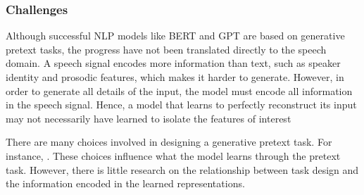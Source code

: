 

\subsubsection{Challenges} 

Although successful NLP models like BERT and GPT are based on generative pretext tasks, the progress have not been translated directly to the speech domain. A speech signal encodes more information than text, such as speaker identity and prosodic features, which makes it harder to generate. However, in order to generate all details of the input, the model must encode all information in the speech signal. Hence, a model that learns to perfectly reconstruct its input may not necessarily have learned to isolate the features of interest  

There are many choices involved in designing a generative pretext task. For instance, . These choices influence what the model learns through the pretext task. However, there is little research on the relationship between task design and the information encoded in the learned representations.



